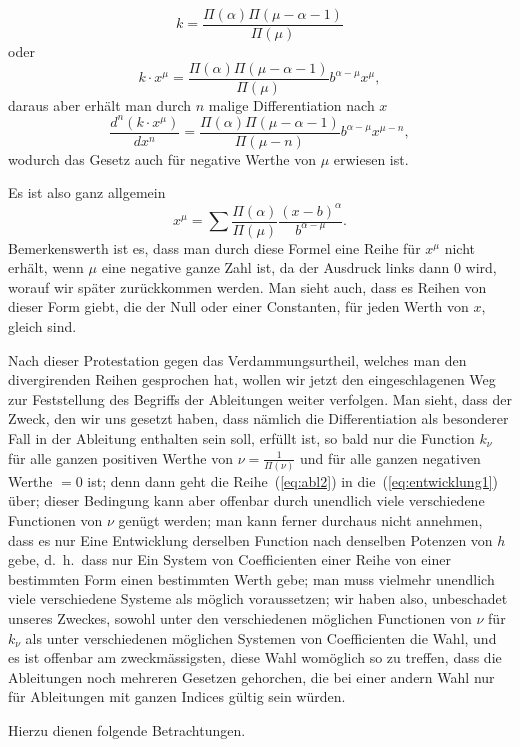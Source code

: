 \documentclass[12pt,a4paper]{article}
\begin{document}
\[
k = \frac{\Pi(\alpha)\Pi(\mu-\alpha-1)}{\Pi(\mu)}
\]
oder
\[
k \cdot x^\mu = \frac{\Pi(\alpha)\Pi(\mu-\alpha-1)}{\Pi(\mu)} b^{\alpha-\mu} x^\mu,
\]
daraus aber erh\"alt man durch $n$ malige Differentiation nach $x$
\[
\frac{d^n(k \cdot x^\mu)}{dx^n} = \frac{\Pi(\alpha)\Pi(\mu-\alpha-1)}{\Pi(\mu-n)} b^{\alpha-\mu} x^{\mu-n},
\]
wodurch das Gesetz auch f\"ur negative Werthe von $\mu$ erwiesen ist.

Es ist also ganz allgemein
\begin{equation}\label{eq:allgemein3}
x^\mu = \sum \frac{\Pi(\alpha)}{\Pi(\mu)} \frac{(x-b)^\alpha}{b^{\alpha-\mu}}.
\end{equation}
Bemerkenswerth ist es, dass man durch diese Formel eine Reihe f\"ur $x^\mu$ nicht erh\"alt, wenn $\mu$ eine negative ganze Zahl ist, da der Ausdruck links dann $0$ wird, worauf wir sp\"ater zur\"uckkommen werden. Man sieht auch, dass es Reihen von dieser Form giebt, die der Null oder einer Constanten, f\"ur jeden Werth von $x$, gleich sind.

Nach dieser Protestation gegen das Verdammungsurtheil, welches man den divergirenden Reihen gesprochen hat, wollen wir jetzt den eingeschlagenen Weg zur Feststellung des Begriffs der Ableitungen weiter verfolgen. Man sieht, dass der Zweck, den wir uns gesetzt haben, dass n\"amlich die Differentiation als besonderer Fall in der Ableitung enthalten sein soll, erf\"ullt ist, so bald nur die Function $k_\nu$ f\"ur alle ganzen positiven Werthe von $\nu = \frac{1}{\Pi(\nu)}$ und f\"ur alle ganzen negativen Werthe $=0$ ist; denn dann geht die Reihe~(\ref{eq:abl2}) in die~(\ref{eq:entwicklung1}) \"uber; dieser Bedingung kann aber offenbar durch unendlich viele verschiedene Functionen von $\nu$ gen\"ugt werden; man kann ferner durchaus nicht annehmen, dass es nur Eine Entwicklung derselben Function nach denselben Potenzen von $h$ gebe, d.\ h.\ dass nur Ein System von Coefficienten einer Reihe von einer bestimmten Form einen bestimmten Werth gebe; man muss vielmehr unendlich viele verschiedene Systeme als m\"oglich voraussetzen; wir haben also, unbeschadet unseres Zweckes, sowohl unter den verschiedenen m\"oglichen Functionen von $\nu$ f\"ur $k_\nu$ als unter verschiedenen m\"oglichen Systemen von Coefficienten die Wahl, und es ist offenbar am zweckm\"assigsten, diese Wahl wom\"oglich so zu treffen, dass die Ableitungen noch mehreren Gesetzen gehorchen, die bei einer andern Wahl nur f\"ur Ableitungen mit ganzen Indices g\"ultig sein w\"urden.

Hierzu dienen folgende Betrachtungen.
\end{document}

